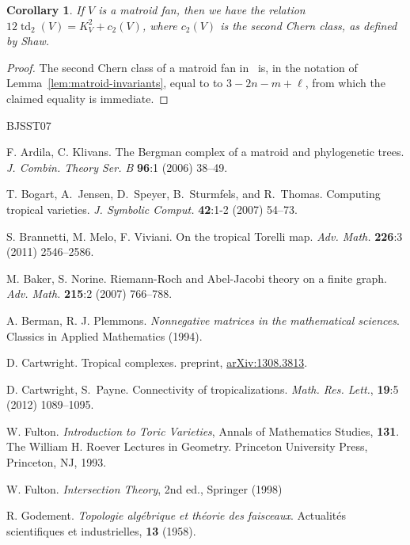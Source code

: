 \documentclass[11pt]{amsart}
\newtheorem{cor}[thm]{Corollary}
\theoremstyle{definition}
\newcommand{\arxiv}[1]{\href{http://arxiv.org/abs/#1}{arXiv:#1}}
\newcommand{\td}{\operatorname{td}}
\begin{document}
\begin{cor}
If $V$ is a matroid fan, then we have the relation $12 \td_2(V) = K_V^2 +
c_2(V)$, where $c_2(V)$ is the second Chern class, as defined by Shaw.
\end{cor}

\begin{proof}
The second Chern class of a matroid fan in~\cite[Def.~3.2.13]{shaw} is, in the
notation of Lemma~\ref{lem:matroid-invariants}, equal to to $3 - 2n - m + \ell$,
from which the claimed equality is immediate.
\end{proof}

\begin{thebibliography}{BJSST07}

F. Ardila, C. Klivans.
The Bergman complex of a matroid and phylogenetic trees.
\textit{J. Combin. Theory Ser. B} \textbf{96}:1 (2006) 38--49.

T. Bogart, A.~Jensen, D.~Speyer, B.~Sturmfels, and R.~Thomas.
Computing tropical varieties.
\textit{J. Symbolic Comput.} \textbf{42}:1-2 (2007) 54--73.

S. Brannetti, M. Melo, F. Viviani.
On the tropical Torelli map.
\textit{Adv. Math.} \textbf{226}:3 (2011) 2546--2586.

M. Baker, S. Norine.
Riemann-Roch and Abel-Jacobi theory on a finite graph.
\textit{Adv. Math.} \textbf{215}:2 (2007) 766--788.

A. Berman, R. J. Plemmons.
\textit{Nonnegative matrices in the mathematical sciences}.
Classics in Applied Mathematics (1994).

D. Cartwright.
Tropical complexes.
preprint, \arxiv{1308.3813}.

D. Cartwright, S.~Payne.
Connectivity of tropicalizations.
\textit{Math. Res. Lett.}, \textbf{19}:5 (2012) 1089--1095.

W. Fulton.
\textit{Introduction to Toric Varieties},
Annals of Mathematics Studies, \textbf{131}.
The William H. Roever Lectures in Geometry. Princeton University Press,
Princeton, NJ, 1993. 

W. Fulton.
\textit{Intersection Theory},
2nd ed., Springer (1998)

R. Godement.
\textit{Topologie alg\'ebrique et th\'eorie des faisceaux}.
Actualit\'es scientifiques et industrielles, \textbf{13} (1958).


\end{thebibliography}
\end{document}
